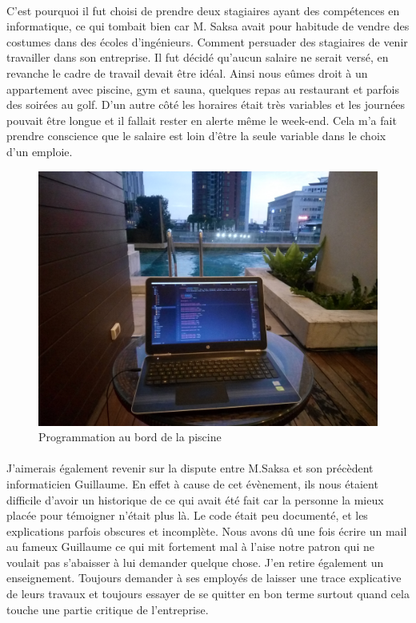   \paragraph{}
  C'est pourquoi il fut choisi de prendre deux stagiaires ayant des compétences en informatique, ce qui tombait bien car M. Saksa avait pour habitude de vendre des costumes dans des écoles d'ingénieurs. Comment persuader des stagiaires de venir travailler dans son entreprise. Il fut décidé qu'aucun salaire ne serait versé, en revanche le cadre de travail devait être idéal. Ainsi nous eûmes droit à un appartement avec piscine, gym et sauna, quelques repas au restaurant et parfois des soirées au golf. D'un autre côté les horaires était très variables et les journées pouvait être longue et il fallait rester en alerte même le week-end. Cela m'a fait prendre conscience que le salaire est loin d'être la seule variable dans le choix d'un emploie. \begin{figure}[!h]
   \centering
   \includegraphics[width=12cm]{image/piscine.jpg}
   \caption{Programmation au bord de la piscine}
   \end{figure}
\paragraph{}
J'aimerais également revenir sur la dispute entre M.Saksa et son précèdent informaticien Guillaume. En effet à cause de cet évènement, ils nous étaient difficile d'avoir un historique de ce qui avait été fait car la personne la mieux placée pour témoigner n'était plus là. Le code était peu documenté, et les explications parfois obscures et incomplète. Nous avons dû une fois écrire un mail au fameux Guillaume ce qui mit fortement mal à l'aise notre patron qui ne voulait pas s'abaisser à lui demander quelque chose. J'en retire également un enseignement. Toujours demander à ses employés de laisser une trace explicative de leurs travaux et toujours essayer de se quitter en bon terme surtout quand cela touche une partie critique de l'entreprise.
